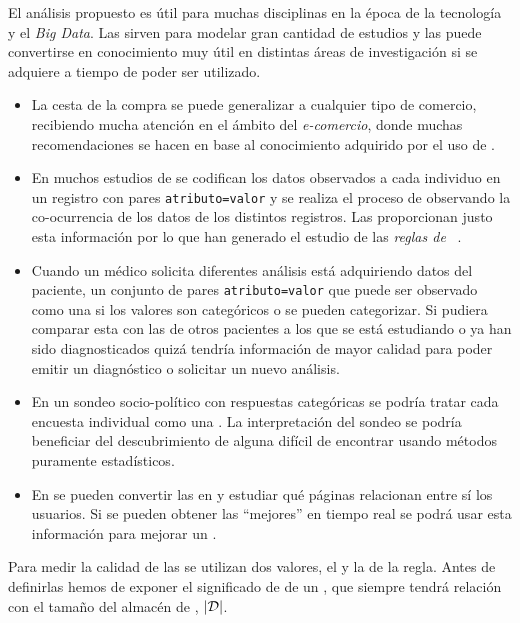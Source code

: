 El análisis propuesto es útil para muchas disciplinas en la época de la tecnología y el \emph{Big Data}. Las \transacciones sirven para modelar gran cantidad de estudios y las \ars puede convertirse en conocimiento muy útil en distintas áreas de investigación si se adquiere a tiempo de poder ser utilizado.

\begin{itemize}
  \item La cesta de la compra se puede generalizar a cualquier tipo de comercio, recibiendo mucha atención en el ámbito del \emph{e-comercio}, donde muchas recomendaciones se hacen en base al conocimiento adquirido por el uso de \ars.
  \item En muchos estudios de \clasificacion se codifican los datos observados a cada individuo en un registro con pares \texttt{atributo=valor} y se realiza el proceso de \clasificacion observando la co-ocurrencia de los datos de los distintos registros. Las \ars proporcionan justo esta información por lo que han generado el estudio de las \emph{reglas de \clasificacion}~\citep{LiuHsuMa-IntegratingClassificationAndARM-1998,ThabtahCowlingHammoud-ImprovingRuleSorting-2006,KahramanliAllahverdi_NewMethodForComposingClassificationRulesARplusOPTBP_2009}.
  \item Cuando un médico solicita diferentes análisis está adquiriendo datos del paciente, un conjunto de pares \texttt{atributo=valor} que puede ser observado como una \transaccion si los valores son categóricos o se pueden categorizar. Si pudiera comparar esta \transaccion con las \transacciones de otros pacientes a los que se está estudiando o ya han sido diagnosticados quizá tendría información de mayor calidad para poder emitir un diagnóstico o solicitar un nuevo análisis.
  \item En un sondeo socio-político con respuestas categóricas se podría tratar cada encuesta individual como una \transaccion. La interpretación del sondeo se podría beneficiar del descubrimiento de alguna \ar difícil de encontrar usando métodos puramente estadísticos.
  \item En \wum se pueden convertir las \sns en \transacciones y estudiar qué páginas relacionan entre sí los usuarios. Si se pueden obtener las "`mejores"' \ars en tiempo real se podrá usar esta información para mejorar un \srw.
\end{itemize}






Para medir la calidad de las \ARs se utilizan dos valores, el \soporte y la \confianza de la regla. Antes de definirlas hemos de exponer el significado de \soporte de un \itemset, que siempre tendrá relación con el tamaño del almacén de \transacciones, $|\D|$.

